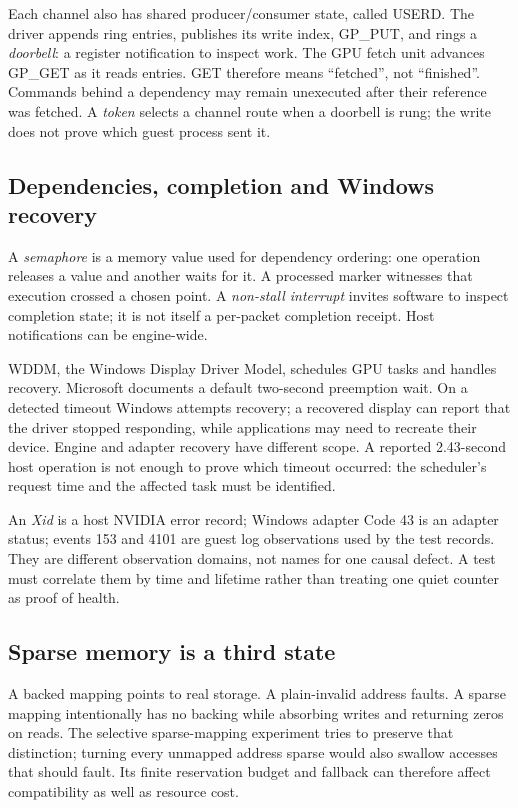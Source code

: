 Each channel also has shared producer/consumer state, called USERD. The driver appends ring
entries, publishes its write index, GP\_PUT, and rings a \emph{doorbell}: a register notification
to inspect work. The GPU fetch unit advances GP\_GET as it reads entries. GET therefore means
``fetched'', not ``finished''. Commands behind a dependency may remain unexecuted after their
reference was fetched. A \emph{token} selects a channel route when a doorbell is rung; the
write does not prove which guest process sent it.

\subsection{Dependencies, completion and Windows recovery}

A \emph{semaphore} is a memory value used for dependency ordering: one operation releases a
value and another waits for it. A processed marker witnesses that execution crossed a chosen
point. A \emph{non-stall interrupt} invites software to inspect completion state; it is not
itself a per-packet completion receipt. Host notifications can be engine-wide.

\doc WDDM, the Windows Display Driver Model, schedules GPU tasks and handles recovery.
Microsoft documents a default two-second preemption wait. On a detected timeout Windows
attempts recovery; a recovered display can report that the driver stopped responding, while
applications may need to recreate their device. Engine and adapter recovery have different
scope. A reported 2.43-second host operation is not enough to prove which timeout occurred:
the scheduler's request time and the affected task must be identified.

An \emph{Xid} is a host NVIDIA error record; Windows adapter Code 43 is an adapter status;
events 153 and 4101 are guest log observations used by the test records. They are different
observation domains, not names for one causal defect. A test must correlate them by time and
lifetime rather than treating one quiet counter as proof of health.

\subsection{Sparse memory is a third state}

\doc A backed mapping points to real storage. A plain-invalid address faults. A sparse
mapping intentionally has no backing while absorbing writes and returning zeros on reads.
The selective sparse-mapping experiment tries to preserve that distinction; turning every
unmapped address sparse would also swallow accesses that should fault. Its finite reservation
budget and fallback can therefore affect compatibility as well as resource cost.

